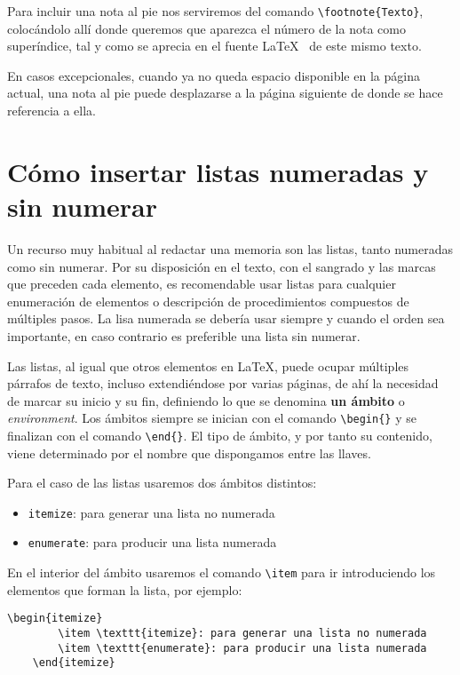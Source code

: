 Para incluir una nota al pie nos serviremos del comando \verb|\footnote{Texto}|, colocándolo allí donde queremos que aparezca el número de la nota como superíndice, tal y como se aprecia en el fuente \LaTeX~ de este mismo texto.

En casos excepcionales, cuando ya no queda espacio disponible en la página actual, una nota al pie puede desplazarse a la página siguiente de donde se hace referencia a ella.

\section{Cómo insertar listas numeradas y sin numerar}

Un recurso muy habitual al redactar una memoria son las listas, tanto numeradas como sin numerar. Por su disposición en el texto, con el sangrado y las marcas que preceden cada elemento, es recomendable usar listas para cualquier enumeración de elementos o descripción de procedimientos compuestos de múltiples pasos. La lisa numerada se debería usar siempre y cuando el orden sea importante, en caso contrario es preferible una lista sin numerar.

Las listas, al igual que otros elementos en \LaTeX, puede ocupar múltiples párrafos de texto, incluso extendiéndose por varias páginas, de ahí la necesidad de marcar su inicio y su fin, definiendo lo que se denomina \textbf{un ámbito} o \textit{environment}. Los ámbitos siempre se inician con el comando \verb|\begin{}| y se finalizan con el comando \verb|\end{}|. El tipo de ámbito, y por tanto su contenido, viene determinado por el nombre que dispongamos entre las llaves.

Para el caso de las listas usaremos dos ámbitos distintos:
    \begin{itemize}
        \item \verb|itemize|: para generar una lista no numerada
        \item \verb|enumerate|: para producir una lista numerada
    \end{itemize}

En el interior del ámbito usaremos el comando \verb|\item| para ir introduciendo los elementos que forman la lista, por ejemplo:

\begin{lstlisting}[language={[LaTeX]TeX},caption={Creación de una lista no numerada con dos elementos},label=List.Itemize]
    \begin{itemize}
        \item \texttt{itemize}: para generar una lista no numerada
        \item \texttt{enumerate}: para producir una lista numerada
    \end{itemize}
\end{lstlisting}

